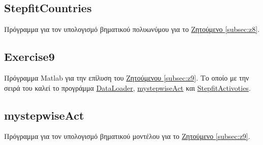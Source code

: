 \documentclass[11pt]{scrartcl} %
\begin{document}
	
	
\subsection{StepfitCountries}
\label{prog:StepfitCountries}
Πρόγραμμα για τον υπολογισμό βηματικού πολυωνύμου για το \hyperref[subsec:z8]{Ζητούμενο \ref*{subsec:z8}}.
	
	
	
	
	
	
\subsection{Exercise9}
\label{prog:9}
Πρόγραμμα Matlab για την επίλυση του \hyperref[subsec:z9]{Ζητούμενου \ref*{subsec:z9}}. Το οποίο με την σειρά του καλεί το προγράμμα \hyperref[prog:DataLoader]{DataLoader}, \hyperref[prog:mystepwiseAct]{mystepwiseAct} και \hyperref[prog:StepfitActivities]{StepfitActivoties}.


\subsection{mystepwiseAct}
\label{prog:mystepwiseAct}
Πρόγραμμα για τον υπολογισμό βηματικού μοντέλου για το \hyperref[subsec:z9]{Ζητούμενο \ref*{subsec:z9}}.
	
	
\end{document}
